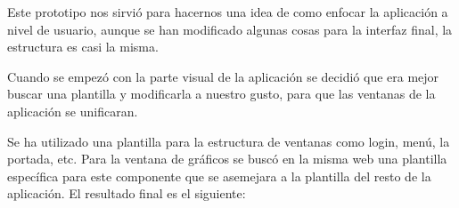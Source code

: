 
Este prototipo nos sirvió para hacernos una idea de como enfocar la aplicación a nivel de usuario, aunque se han modificado algunas cosas para la interfaz final, la estructura es casi la misma.

Cuando se empezó con la parte visual de la aplicación se decidió que era mejor buscar una plantilla y modificarla a nuestro gusto, para que las ventanas de la aplicación se unificaran.

\newpage
Se ha utilizado una plantilla para la estructura de ventanas como login, menú, la portada, etc. Para la ventana de gráficos se buscó en la misma web una plantilla específica para este componente que se asemejara a la plantilla del resto de la aplicación. El resultado final es el siguiente:




